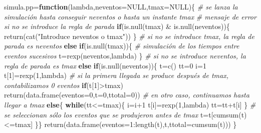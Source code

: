 \documentclass[
]{book}
\newenvironment{Shaded}{\begin{snugshade}}{\end{snugshade}}
\newcommand{\AttributeTok}[1]{\textcolor[rgb]{0.77,0.63,0.00}{#1}}
\newcommand{\CommentTok}[1]{\textcolor[rgb]{0.56,0.35,0.01}{\textit{#1}}}
\newcommand{\ConstantTok}[1]{\textcolor[rgb]{0.00,0.00,0.00}{#1}}
\newcommand{\ControlFlowTok}[1]{\textcolor[rgb]{0.13,0.29,0.53}{\textbf{#1}}}
\newcommand{\DecValTok}[1]{\textcolor[rgb]{0.00,0.00,0.81}{#1}}
\newcommand{\FunctionTok}[1]{\textcolor[rgb]{0.00,0.00,0.00}{#1}}
\newcommand{\NormalTok}[1]{#1}
\newcommand{\OtherTok}[1]{\textcolor[rgb]{0.56,0.35,0.01}{#1}}
\newcommand{\SpecialCharTok}[1]{\textcolor[rgb]{0.00,0.00,0.00}{#1}}
\newcommand{\StringTok}[1]{\textcolor[rgb]{0.31,0.60,0.02}{#1}}
\theoremstyle{definition}
\theoremstyle{definition}
\theoremstyle{definition}
\theoremstyle{definition}
\theoremstyle{remark}
\begin{document}
\begin{Shaded}
\begin{Highlighting}[]
\NormalTok{simula.pp}\OtherTok{=}\ControlFlowTok{function}\NormalTok{(lambda,}\AttributeTok{neventos=}\ConstantTok{NULL}\NormalTok{,}\AttributeTok{tmax=}\ConstantTok{NULL}\NormalTok{)\{}
  \CommentTok{\# se lanza la simulación hasta conseguir neventos o hasta un instante tmax}
  \CommentTok{\# mensaje de error si no se introduce la regla de parada}
  \ControlFlowTok{if}\NormalTok{(}\FunctionTok{is.null}\NormalTok{(tmax) }\SpecialCharTok{\&} \FunctionTok{is.null}\NormalTok{(neventos))\{}
    \FunctionTok{return}\NormalTok{(}\FunctionTok{cat}\NormalTok{(}\StringTok{"Introduce neventos o tmax"}\NormalTok{))}
\NormalTok{  \}}
  \CommentTok{\# si no se introduce tmax, la regla de parada es neventos}
  \ControlFlowTok{else} \ControlFlowTok{if}\NormalTok{(}\FunctionTok{is.null}\NormalTok{(tmax))\{}
    \CommentTok{\# simulación de los tiempos entre eventos sucesivos}
\NormalTok{    t}\OtherTok{=}\FunctionTok{rexp}\NormalTok{(neventos,lambda)}
\NormalTok{  \}}
  \CommentTok{\# si no se introduce neventos, la regla de parada es tmax}
  \ControlFlowTok{else} \ControlFlowTok{if}\NormalTok{(}\FunctionTok{is.null}\NormalTok{(neventos))\{}
\NormalTok{    t}\OtherTok{=}\FunctionTok{c}\NormalTok{()}
\NormalTok{    tt}\OtherTok{=}\DecValTok{0}
\NormalTok{    i}\OtherTok{=}\DecValTok{1}
\NormalTok{    t[}\DecValTok{1}\NormalTok{]}\OtherTok{=}\FunctionTok{rexp}\NormalTok{(}\DecValTok{1}\NormalTok{,lambda)}
    \CommentTok{\# si la primera llegada se produce después de tmax, contabilizamos 0 eventos}
    \ControlFlowTok{if}\NormalTok{(t[}\DecValTok{1}\NormalTok{]}\SpecialCharTok{\textgreater{}}\NormalTok{tmax)}
      \FunctionTok{return}\NormalTok{(}\FunctionTok{data.frame}\NormalTok{(}\AttributeTok{eventos=}\DecValTok{0}\NormalTok{,}\AttributeTok{t=}\DecValTok{0}\NormalTok{,}\AttributeTok{ttotal=}\DecValTok{0}\NormalTok{))}
    \CommentTok{\# en otro caso, continuamos hasta llegar a tmax}
    \ControlFlowTok{else}\NormalTok{\{}
    \ControlFlowTok{while}\NormalTok{(tt}\SpecialCharTok{\textless{}=}\NormalTok{tmax)\{}
\NormalTok{      i}\OtherTok{=}\NormalTok{i}\SpecialCharTok{+}\DecValTok{1}
\NormalTok{      t[i]}\OtherTok{=}\FunctionTok{rexp}\NormalTok{(}\DecValTok{1}\NormalTok{,lambda)}
\NormalTok{      tt}\OtherTok{=}\NormalTok{tt}\SpecialCharTok{+}\NormalTok{t[i]}
\NormalTok{        \}}
    \CommentTok{\# se seleccionan sólo los eventos que se produjeron antes de tmax}
\NormalTok{    t}\OtherTok{=}\NormalTok{t[}\FunctionTok{cumsum}\NormalTok{(t)}\SpecialCharTok{\textless{}=}\NormalTok{tmax]}
\NormalTok{  \}\}}
\FunctionTok{return}\NormalTok{(}\FunctionTok{data.frame}\NormalTok{(}\AttributeTok{eventos=}\DecValTok{1}\SpecialCharTok{:}\FunctionTok{length}\NormalTok{(t),t,}\AttributeTok{ttotal=}\FunctionTok{cumsum}\NormalTok{(t)))}
\NormalTok{\}}
\end{Highlighting}
\end{Shaded}
\end{document}
